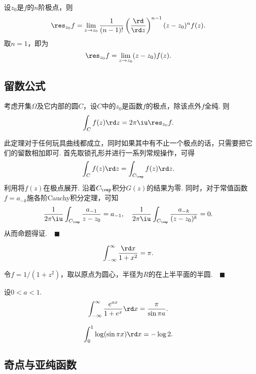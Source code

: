   \begin{thm}[留数的计算]
    设$z_0$是$f$的$n$阶极点，则
    \[
      \res_{z_0}f = \lim_{z\to z_0}\frac{1}{(n-1)!}
      \left(\frac{\rd}{\rd z}\right)^{n-1}(z-z_0)^nf(z).
    \]
    取$n=1$，即为
    \[
     \res_{z_0}f = \lim_{z\to z_0}(z-z_0)f(z). 
    \]
  \end{thm}


\subsection{留数公式}
  \begin{thm}[留数公式]
    考虑开集$\Omega$及它内部的圆$C$，设$C$中的$z_0$是函数$f$的极点，除该点外$f$全纯. 则
    \begin{equation}
      \label{equ: 留数公式}
      \int_C f(z)\rd z = 2\pi\iu\res_{z_0}f.
    \end{equation}
  \end{thm}
  \remark
    此定理对于任何玩具曲线都成立，同时如果其中有不止一个极点的话，只需要把它们的留数相加即可.
  \proof
    首先取锁孔形并进行一系列常规操作，可得
    \[
      \int_{C}f(z)\rd z = \int_{C_\vep} f(z)\rd z.
    \]
    利用将$f(z)$在极点展开. 沿着$C_\vep$积分$G(z)$的结果为零.
    同时，对于常值函数$f=a_{-k}$施各阶Cauchy积分定理，可知
    \[
      \frac{1}{2\pi\iu}\int_{C_\vep}\frac{a_{-1}}{z-z_0}=a_{-1},\quad
      \frac{1}{2\pi\iu}\int_{C_\vep}\frac{a_{-k}}{(z-z_0)^k}=0.
    \]
    从而命题得证.$\quad\blacksquare$

  \begin{pos}
    \[
      \int_{-\infty}^\infty \frac{\rd x}{1+x^2} = \pi.
    \]
  \end{pos}
  \proof
    令$f = 1/(1+z^2)$，取以原点为圆心，半径为$R$的在上半平面的半圆.$\quad\blacksquare$

  \begin{pos}
    设$0<a<1$. 
    \[
      \int_{-\infty}^\infty \frac{e^{ax}}{1+e^x}\rd x = \frac{\pi}{\sin\pi a}.
    \]
  \end{pos}

  \begin{pos}
    \[
      \int_0^1\log(\sin\pi x)\rd x = -\log 2.
    \]
  \end{pos}
  
\subsection{奇点与亚纯函数}

